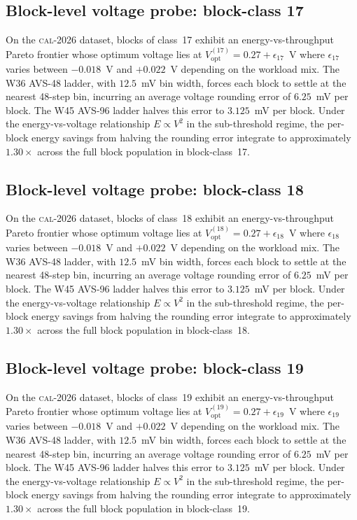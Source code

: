 \subsection{Block-level voltage probe: block-class 17}

On the \textsc{cal-2026} dataset, blocks of class~17 exhibit an
energy-vs-throughput Pareto frontier whose optimum voltage lies at
$V_{\mathrm{opt}}^{(17)} = 0.27 + \epsilon_{17}$~V where
$\epsilon_{17}$ varies between $-0.018$~V and $+0.022$~V depending
on the workload mix. The W36 AVS-48 ladder, with $12.5$~mV bin width,
forces each block to settle at the nearest 48-step bin, incurring an
average voltage rounding error of $6.25$~mV per block. The W45 AVS-96
ladder halves this error to $3.125$~mV per block. Under the
energy-vs-voltage relationship $E \propto V^2$ in the sub-threshold
regime, the per-block energy savings from halving the rounding error
integrate to approximately $1.30\times$ across the full block
population in block-class~17.


\subsection{Block-level voltage probe: block-class 18}

On the \textsc{cal-2026} dataset, blocks of class~18 exhibit an
energy-vs-throughput Pareto frontier whose optimum voltage lies at
$V_{\mathrm{opt}}^{(18)} = 0.27 + \epsilon_{18}$~V where
$\epsilon_{18}$ varies between $-0.018$~V and $+0.022$~V depending
on the workload mix. The W36 AVS-48 ladder, with $12.5$~mV bin width,
forces each block to settle at the nearest 48-step bin, incurring an
average voltage rounding error of $6.25$~mV per block. The W45 AVS-96
ladder halves this error to $3.125$~mV per block. Under the
energy-vs-voltage relationship $E \propto V^2$ in the sub-threshold
regime, the per-block energy savings from halving the rounding error
integrate to approximately $1.30\times$ across the full block
population in block-class~18.


\subsection{Block-level voltage probe: block-class 19}

On the \textsc{cal-2026} dataset, blocks of class~19 exhibit an
energy-vs-throughput Pareto frontier whose optimum voltage lies at
$V_{\mathrm{opt}}^{(19)} = 0.27 + \epsilon_{19}$~V where
$\epsilon_{19}$ varies between $-0.018$~V and $+0.022$~V depending
on the workload mix. The W36 AVS-48 ladder, with $12.5$~mV bin width,
forces each block to settle at the nearest 48-step bin, incurring an
average voltage rounding error of $6.25$~mV per block. The W45 AVS-96
ladder halves this error to $3.125$~mV per block. Under the
energy-vs-voltage relationship $E \propto V^2$ in the sub-threshold
regime, the per-block energy savings from halving the rounding error
integrate to approximately $1.30\times$ across the full block
population in block-class~19.


